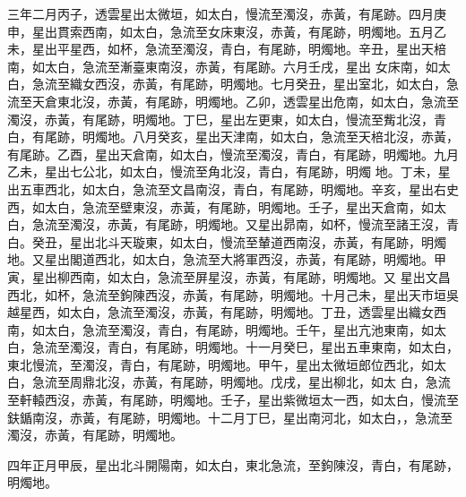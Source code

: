 \begin{pinyinscope}
 三年二月丙子，透雲星出太微垣，如太白，慢流至濁沒，赤黃，有尾跡。四月庚申，星出貫索西南，如太白，急流至女床東沒，赤黃，有尾跡，明燭地。五月乙未，星出平星西，如杯，急流至濁沒，青白，有尾跡，明燭地。辛丑，星出天棓南，如太白，急流至漸臺東南沒，赤黃，有尾跡。六月壬戌，星出
 女床南，如太白，急流至織女西沒，赤黃，有尾跡，明燭地。七月癸丑，星出室北，如太白，急流至天倉東北沒，赤黃，有尾跡，明燭地。乙卯，透雲星出危南，如太白，急流至濁沒，赤黃，有尾跡，明燭地。丁巳，星出左更東，如太白，慢流至觜北沒，青白，有尾跡，明燭地。八月癸亥，星出天津南，如太白，急流至天棓北沒，赤黃，有尾跡。乙酉，星出天倉南，如太白，慢流至濁沒，青白，有尾跡，明燭地。九月乙未，星出七公北，如太白，慢流至角北沒，青白，有尾跡，明燭
 地。丁未，星出五車西北，如太白，急流至文昌南沒，青白，有尾跡，明燭地。辛亥，星出右史西，如太白，急流至壁東沒，赤黃，有尾跡，明燭地。壬子，星出天倉南，如太白，急流至濁沒，赤黃，有尾跡，明燭地。又星出昴南，如杯，慢流至諸王沒，青白。癸丑，星出北斗天璇東，如太白，慢流至輦道西南沒，赤黃，有尾跡，明燭地。又星出閣道西北，如太白，急流至大將軍西沒，赤黃，有尾跡，明燭地。甲寅，星出柳西南，如太白，急流至屏星沒，赤黃，有尾跡，明燭地。又
 星出文昌西北，如杯，急流至鉤陳西沒，赤黃，有尾跡，明燭地。十月己未，星出天市垣吳越星西，如太白，急流至濁沒，赤黃，有尾跡，明燭地。丁丑，透雲星出織女西南，如太白，急流至濁沒，青白，有尾跡，明燭地。壬午，星出亢池東南，如太白，急流至濁沒，青白，有尾跡，明燭地。十一月癸巳，星出五車東南，如太白，東北慢流，至濁沒，青白，有尾跡，明燭地。甲午，星出太微垣郎位西北，如太白，急流至周鼎北沒，赤黃，有尾跡，明燭地。戊戌，星出柳北，如太
 白，急流至軒轅西沒，赤黃，有尾跡，明燭地。壬子，星出紫微垣太一西，如太白，慢流至鈇鍎南沒，赤黃，有尾跡，明燭地。十二月丁巳，星出南河北，如太白，，急流至濁沒，赤黃，有尾跡，明燭地。



 四年正月甲辰，星出北斗開陽南，如太白，東北急流，至鉤陳沒，青白，有尾跡，明燭地。




\end{pinyinscope}

